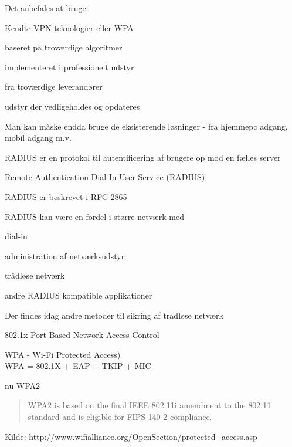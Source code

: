 \documentclass[Screen16to9,17pt]{foils}
\begin{document}

\begin{list1}
\item Det anbefales at bruge:
\item Kendte VPN teknologier eller WPA
\item baseret på troværdige algoritmer
\item implementeret i professionelt udstyr
\item fra troværdige leverandører
\item udstyr der vedligeholdes og opdateres
\item Man kan måske endda bruge de eksisterende løsninger - fra
  hjemmepc adgang, mobil adgang m.v.
\end{list1}


\begin{list1}
\item RADIUS er en protokol til autentificering af brugere op mod en
  fælles server
\item Remote Authentication Dial In User Service (RADIUS)
\item RADIUS er beskrevet i RFC-2865
\item RADIUS kan være en fordel i større netværk med
\begin{list2}
\item dial-in
\item administration af netværksudstyr
\item trådløse netværk
\item andre RADIUS kompatible applikationer
\end{list2}
\end{list1}


\begin{list1}
\item Der findes idag andre metoder til sikring af trådløse netværk
\item 802.1x Port Based Network Access Control
\item WPA - Wi-Fi Protected Access)\\
WPA = 802.1X + EAP + TKIP + MIC
\item nu WPA2
\begin{quote}
WPA2 is based on the final IEEE 802.11i amendment to the 802.11
standard and is eligible for FIPS 140-2 compliance.
\end{quote}
\item Kilde:
\href{http://www.wifialliance.org/OpenSection/protected_access.asp}
{http://www.wifialliance.org/OpenSection/protected\_access.asp}
\end{list1}
\end{document}
